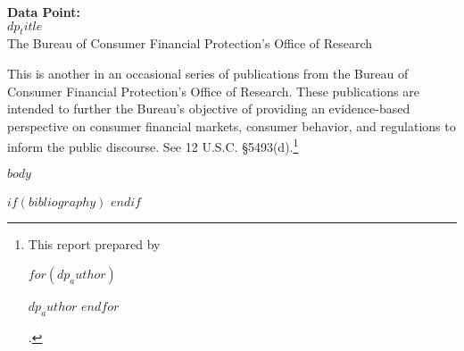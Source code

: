 \documentclass[12pt,letterpaper,twoside]{article}
\begin{document}

\begin{titlepage}
  \thispagestyle{fancy}
  \vspace*{1.5in}
  \begin{addmargin}[0in]{1in}
  {\color{black}  \fontsize{38}{38} \selectfont \textbf{Data Point:}\\[25pt]
  $dp_title$\\[40pt]
  \fontsize{14}{14} \selectfont The Bureau of Consumer Financial Protection’s Office of Research\par}
  \end{addmargin}
\end{titlepage}

\raggedright
\fancyhead[L]{}  %
\fancyfoot[R]{}
This is another in an occasional series of publications from the Bureau of Consumer Financial Protection’s Office of Research. These publications are intended to further the Bureau’s objective of providing an evidence-based perspective on consumer financial markets, consumer behavior, and regulations to inform the public discourse. See 12 U.S.C. §5493(d).\footnote{This report prepared by
\begin{itemize*}[label={}, afterlabel={}, itemjoin={,\nobreakspace}, itemjoin*={, and\nobreakspace}]
  $for(dp_author)$
    \item $dp_author$
  $endfor$
\end{itemize*}.}
\newpage

\vspace*{1.5in}
\tableofcontents
\thispagestyle{fancy}

\newpage


$body$

$if(bibliography)$
\newpage
\printbibliography[heading=bibintoc,title={References}]
$endif$

%

%

\end{document}
